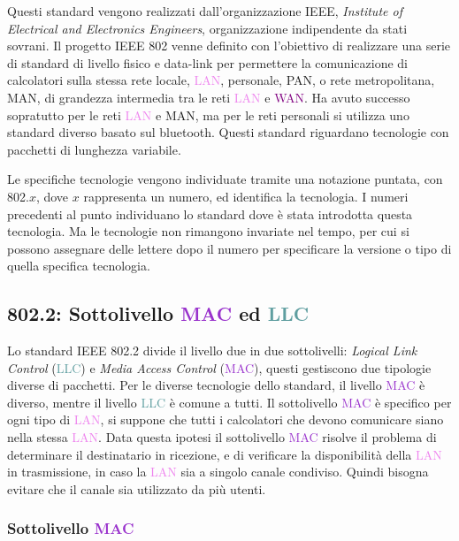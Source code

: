 \documentclass{article}
\numberwithin{equation}{subsection}
\begin{document}
Questi standard vengono realizzati dall'organizzazione IEEE, \textit{Institute of Electrical and Electronics Engineers}, organizzazione indipendente da stati sovrani. Il progetto IEEE 802 venne definito con 
l'obiettivo di realizzare una serie di standard di livello fisico e data-link per permettere la comunicazione di calcolatori sulla stessa rete locale, \textcolor{violet}{LAN}, personale, PAN, o rete metropolitana, MAN, di grandezza 
intermedia tra le reti \textcolor{violet}{LAN} e \textcolor{purple}{WAN}. Ha avuto successo sopratutto per le reti \textcolor{violet}{LAN} e MAN, ma per le reti personali si utilizza uno standard diverso basato sul bluetooth. 
Questi standard riguardano tecnologie con pacchetti di lunghezza variabile.


Le specifiche tecnologie vengono individuate tramite una notazione puntata, con 802.$x$, dove $x$ rappresenta un numero, ed identifica la tecnologia. I numeri precedenti al punto individuano lo standard dove è 
stata introdotta questa tecnologia. Ma le tecnologie non rimangono invariate nel tempo, per cui si possono assegnare delle lettere dopo il numero per specificare la versione o tipo di quella specifica tecnologia. 

\subsection{802.2: Sottolivello \textcolor{DarkOrchid}{MAC} ed \textcolor{CadetBlue}{LLC}}

Lo standard IEEE 802.2 divide il livello due in due sottolivelli: \textit{Logical Link Control} (\textcolor{CadetBlue}{LLC}) e \textit{Media Access Control}  (\textcolor{DarkOrchid}{MAC}), questi gestiscono due tipologie diverse di pacchetti. Per le diverse tecnologie dello standard, il livello \textcolor{DarkOrchid}{MAC} è diverso, mentre il livello 
\textcolor{CadetBlue}{LLC} è comune a tutti. 
Il sottolivello \textcolor{DarkOrchid}{MAC} è specifico per ogni tipo di \textcolor{violet}{LAN}, si suppone che tutti i calcolatori che devono comunicare siano nella stessa \textcolor{violet}{LAN}. Data questa ipotesi il sottolivello \textcolor{DarkOrchid}{MAC} risolve il problema di determinare 
il destinatario in ricezione, e di verificare la disponibilità della \textcolor{violet}{LAN} in trasmissione, in caso la \textcolor{violet}{LAN} sia a singolo canale condiviso. Quindi bisogna evitare che il canale sia utilizzato da più utenti. 


\subsubsection{Sottolivello \textcolor{DarkOrchid}{MAC}}
\end{document}
